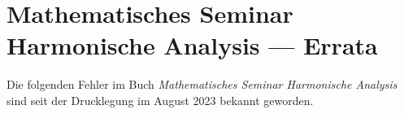 \documentclass{article}
\begin{document}
\def\fehler#1#2{
\bgroup\parindent0pt
\rule[0mm]{\textwidth}{0.5pt}
\hbox to\hsize{%
#1
\hfill
#2}
\rule[2mm]{\textwidth}{0.5pt}
\egroup
}

\def\korrektur#1{
\vspace{5mm}
\parindent0pt
Korrektur-Diff:\\
\small

}

\section*{Mathematisches Seminar Harmonische Analysis --- Errata}

Die folgenden Fehler im Buch {\em Mathematisches Seminar Harmonische Analysis}
sind seit der Drucklegung im August 2023 bekannt geworden.

\vspace*{1cm}

\end{document}
